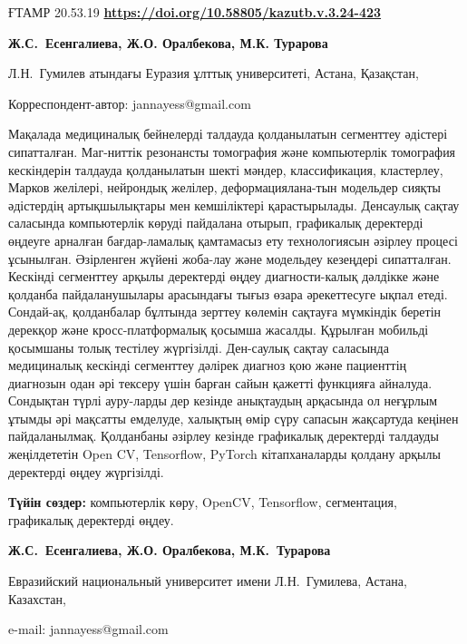 \newpage
ҒТАМР 20.53.19
\hfill {\bfseries \href{https://doi.org/10.58805/kazutb.v.3.24-423}{https://doi.org/10.58805/kazutb.v.3.24-423}}


\begin{center}
 
{\bfseries Ж.С.~Есенгалиева\envelope, Ж.О. Оралбекова, М.К.
Турарова}

Л.Н.~Гумилев атындағы Еуразия ұлттық университеті, Астана, Қазақстан,
\end{center}
\envelope Корреспондент-автор: jannayess@gmail.com \vspace{0.5cm}

Мақалада медициналық бейнелерді талдауда қолданылатын сегменттеу
әдістері сипатталған. Маг-ниттік резонансты томография және компьютерлік
томография кескіндерін талдауда қолданылатын шекті мәндер,
классификация, кластерлеу, Марков желілері, нейрондық желілер,
деформациялана-тын модельдер сияқты әдістердің артықшылықтары мен
кемшіліктері қарастырылады. Денсаулық сақтау саласында компьютерлік
көруді пайдалана отырып, графикалық деректерді өңдеуге арналған
бағдар-ламалық қамтамасыз ету технологиясын әзірлеу процесі ұсынылған.
Әзірленген жүйені жоба-лау және модельдеу кезеңдері сипатталған. Кескінді
сегменттеу арқылы деректерді өңдеу диагности-калық дәлдікке және қолданба
пайдаланушылары арасындағы тығыз өзара әрекеттесуге ықпал етеді.
Сондай-ақ, қолданбалар бұлтында зерттеу көлемін сақтауға мүмкіндік
беретін дерекқор және кросс-платформалық қосымша жасалды. Құрылған
мобильді қосымшаны толық тестілеу жүргізілді. Ден-саулық сақтау саласында
медициналық кескінді сегменттеу дәлірек диагноз қою және пациенттің
диагнозын одан әрі тексеру үшін барған сайын қажетті функцияға айналуда.
Сондықтан түрлі ауру-ларды дер кезінде анықтаудың арқасында ол неғұрлым
ұтымды әрі мақсатты емделуде, халықтың өмір сүру сапасын жақсартуда
кеңінен пайдаланылмақ. Қолданбаны әзірлеу кезінде графикалық деректерді
талдауды жеңілдететін Open CV, Tensorflow, PyTorch кітапханаларды
қолдану арқылы деректерді өңдеу жүргізілді.

{\bfseries Түйін сөздер:} компьютерлік көру, OpenCV, Tensorflow,
сегментация, графикалық деректерді өңдеу.


\begin{center}


{\bfseries Ж.С.~Есенгалиева\envelope, Ж.О. Оралбекова,
М.К.~Турарова}

Евразийский национальный университет имени Л.Н.~Гумилева, Астана,
Казахстан,

e-mail: jannayess@gmail.com
\end{center}

